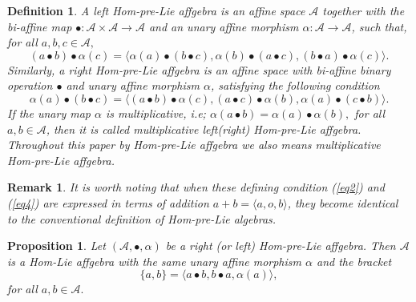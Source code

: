 \documentclass[14pt]{article}
\newtheorem{Prop}[thm]{Proposition}
\theoremstyle{Definition}
\newtheorem{Def}[thm]{Definition}
\newtheorem{Rem}[thm]{Remark}
\theoremstyle{remark}
\begin{document}
\begin{Def}
A left Hom-pre-Lie affgebra is an affine space $\mathcal{A}$ together with the bi-affine map $\bullet:\mathcal{A}\times\mathcal{A}\rightarrow \mathcal{A}$ and an unary affine morphism $\alpha:\mathcal{A}\rightarrow \mathcal{A}$, such that, for all $a,b,c\in \mathcal{A},$
\begin{equation}\label{eq2}
(a\bullet b)\bullet\alpha(c)=\langle \alpha(a)\bullet (b\bullet c),\alpha(b)\bullet(a\bullet c),(b\bullet a)\bullet\alpha(c)\rangle.
\end{equation}
Similarly, a right Hom-pre-Lie affgebra is an affine space with bi-affine binary operation $\bullet$ and unary affine morphism $\alpha$, satisfying the following condition
\begin{equation}\label{eq4}
\alpha(a)\bullet(b\bullet c)=\langle(a\bullet b)\bullet\alpha(c),(a\bullet c)\bullet \alpha(b),\alpha(a)\bullet(c\bullet b)\rangle.
\end{equation}
If the unary map $\alpha$ is multiplicative, i.e; $\alpha(a\bullet b)=\alpha(a)\bullet\alpha(b),$ for all $a,b\in \mathcal{A}$, then it is called multiplicative left(right) Hom-pre-Lie affgebra. Throughout this paper by Hom-pre-Lie affgebra we also means multiplicative Hom-pre-Lie affgebra.
\end{Def}
\begin{Rem}
It is worth noting that when these defining condition (\ref{eq2}) and (\ref{eq4}) are expressed in terms of addition $a+b=\langle a,o,b\rangle$, they become identical to the conventional definition of Hom-pre-Lie algebras.
\end{Rem}
\begin{Prop}
Let $(\mathcal{A},\bullet,\alpha)$ be a right (or left) Hom-pre-Lie affgebra. Then $\mathcal{A}$ is a Hom-Lie affgebra with the same unary affine morphism $\alpha$ and the bracket
$$
\{a,b\}=\langle a\bullet b,b\bullet a,\alpha(a)\rangle,
$$
for all $a,b\in \mathcal{A}.$
\end{Prop}
\end{document}
